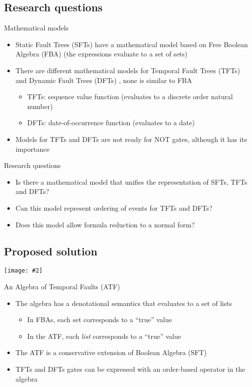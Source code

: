 \documentclass{beamer}
\def\SFT{%
	Static Fault Tree (SFT)%
	\gdef\SFT{SFT\xspace}%
	\gdef\SFTs{SFTs\xspace}%
	\xspace%
}
\def\SFTs{%
	Static Fault Trees (SFTs)%
	\gdef\SFT{SFT\xspace}%
	\gdef\SFTs{SFTs\xspace}%
	\xspace%
}
\def\TFT{%
	Temporal Fault Tree (TFT)%
	\gdef\TFT{TFT\xspace}%
	\gdef\TFTs{TFTs\xspace}%
	\xspace%
}
\def\TFTs{%
	Temporal Fault Trees (TFTs)%
	\gdef\TFT{TFT\xspace}%
	\gdef\TFTs{TFTs\xspace}%
	\xspace%
}
\def\DFT{%
	Dynamic Fault Tree (DFT)%
	\gdef\DFT{DFT\xspace}%
	\gdef\DFTs{DFTs\xspace}%
	\xspace%
}
\def\DFTs{%
	Dynamic Fault Trees (DFTs)%
	\gdef\DFT{DFT\xspace}%
	\gdef\DFTs{DFTs\xspace}%
	\xspace%
}
\def\FBA{%
	Free Boolean Algebra (FBA)%
	\gdef\FBA{FBA\xspace}%
	\gdef\FBAs{FBAs\xspace}%
	\gdef\iFBA{an FBA\xspace}%
	\xspace%
}
\def\FBAs{%
	Free Boolean Algebras (FBAs)%
	\gdef\FBA{FBA\xspace}%
	\gdef\FBAs{FBAs\xspace}%
	\gdef\iFBA{an FBA\xspace}%
	\xspace%
}
\def\iFBA{%
	a Free Boolean Algebra (FBA)%
	\gdef\FBA{FBA\xspace}%
	\gdef\FBAs{FBAs\xspace}%
	\gdef\iFBA{an FBA\xspace}%
	\xspace%
}
\def\ATF{%
	Algebra of Temporal Faults (ATF)%
	\gdef\ATF{ATF\xspace}%
	\gdef\iATF{an ATF\xspace}%
	\gdef\IATF{An ATF\xspace}%
	\xspace%
}
\def\IlATF{%
	An Algebra of Temporal Faults (ATF)%
	\gdef\ATF{ATF\xspace}%
	\gdef\iATF{an ATF\xspace}%
	\gdef\IATF{An ATF\xspace}%
	\xspace%
}
\def\iATF{%
	an Algebra of Temporal Faults (ATF)%
	\gdef\ATF{ATF\xspace}%
	\gdef\iATF{an ATF\xspace}%
	\gdef\IATF{An ATF\xspace}%
	\xspace%
}
\def\IATF{%
	An Algebra of Temporal Faults (ATF)%
	\gdef\ATF{ATF\xspace}%
	\gdef\iATF{an ATF\xspace}%
	\gdef\IATF{An ATF\xspace}%
	\xspace%
}
\newcommand{\includegraphicsaspectratio}[2][1]{%
  \texttt{[image: \#2]}%
}
\begin{document}
\subsection{Research questions}

\begin{frame}{Mathematical models}
	\begin{itemize}
		\item \SFTs have a mathematical model based on \FBA (the expressions evaluate to a set of sets)
		\item There are different mathematical models for \TFTs and \DFTs, none is similar to \FBA
		\begin{itemize}
			\item \TFTs: sequence value function (evaluates to a discrete order natural number)
			\item \DFTs: date-of-occurrence function (evaluates to a date)
		\end{itemize}
		\item Models for \TFTs and \DFTs are not ready for NOT gates, although it has its importance
	\end{itemize}
\end{frame}

\begin{frame}{Research questions}
	\begin{itemize}
		\item Is there a mathematical model that unifies the representation of \SFTs, \TFTs and \DFTs?
		\item Can this model represent ordering of events for \TFTs and \DFTs? 
		\item Does this model allow formula reduction to a normal form?
	\end{itemize}
\end{frame}

\subsection{Proposed solution}
\begin{frame}
	\begin{center}
		\includegraphicsaspectratio[1]{StrategyOverview}
	\end{center}
\end{frame}

\begin{frame}{\IlATF}
	\begin{itemize}
		\item The algebra has a denotational semantics that evaluates to a set of lists
		\begin{itemize}
			\item In \FBAs, each set corresponds to a ``true'' value
			\item In the \ATF, each \emph{list} corresponds to a ``true'' value
		\end{itemize}
		\item The \ATF is a conservative extension of Boolean Algebra (\SFT)
		\item \TFTs and \DFTs gates can be expressed with an order-based operator in the algebra
	\end{itemize}
\end{frame}
\end{document}

